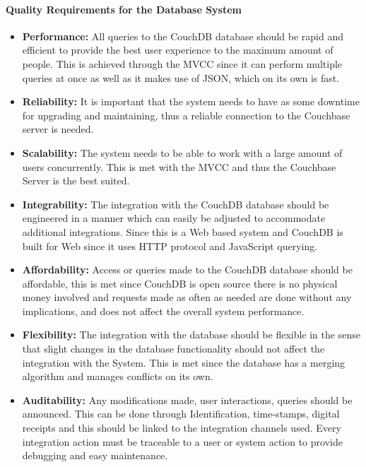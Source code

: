 \documentclass[a4paper]{article}
\begin{document}
	\paragraph{Quality Requirements for the Database System}
	\begin{itemize}
		\item{\textbf{Performance:} All queries to the CouchDB database should be rapid and efficient to provide the best user experience to the maximum amount of people. This is achieved through the MVCC since it can perform multiple queries at once as well as it makes use of JSON, which on its own is fast.}
		\item{\textbf{Reliability:} It is important that the system needs to have as some downtime for upgrading and maintaining, thus a reliable connection to the Couchbase server is needed. }
		\item{\textbf{Scalability:} The system needs to be able to work with a large amount of users concurrently. This is met with the MVCC and thus the Couchbase Server is the best suited.}
		\item{\textbf{Integrability:} The integration with the CouchDB database should be engineered in a manner which can easily be adjusted to accommodate additional integrations. Since this is a Web based system and CouchDB is built for Web since it uses HTTP protocol and JavaScript querying.}
		\item{\textbf{Affordability:} Access or queries made to the CouchDB database should be affordable, this is met since CouchDB is open source there is no physical money involved and requests made as often as needed are done without any implications, and does not affect the overall system performance.}
		\item{\textbf{Flexibility:} The integration with the database should be flexible in the sense that slight changes in the database functionality should not affect the integration with the System. This is met since the database has a merging algorithm and manages conflicts on its own.}
		\item{\textbf{Auditability:} Any modifications made, user interactions, queries should be announced. This can be done through Identification, time-stamps, digital receipts and this should be linked to the integration channels used. Every integration action must be traceable to a user or system action to provide debugging and easy maintenance.}
	\end{itemize}
	
	
	
\end{document}
